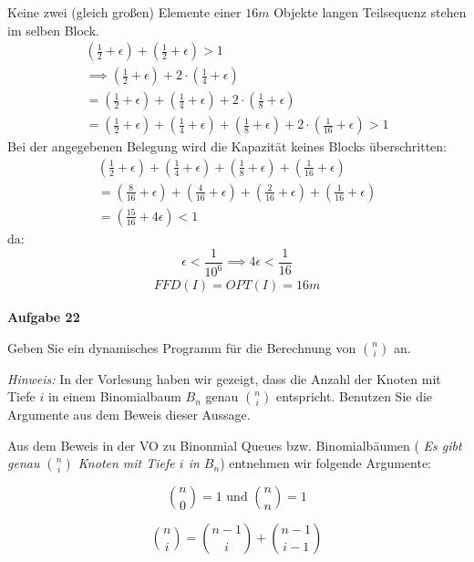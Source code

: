 \documentclass{article}
\begin{document}
Keine zwei (gleich großen) Elemente einer $16m$ Objekte langen Teilsequenz stehen im selben Block.
\begin{align*}
(\frac{1}{2}+\epsilon)+(\frac{1}{2}+\epsilon) > 1\\
\implies (\frac{1}{2}+\epsilon)+2\cdot(\frac{1}{4}+\epsilon)\\ 
=(\frac{1}{2}+\epsilon)+(\frac{1}{4}+\epsilon)+2\cdot(\frac{1}{8}+\epsilon)\\
=(\frac{1}{2}+\epsilon)+(\frac{1}{4}+\epsilon)+(\frac{1}{8}+\epsilon)+2\cdot(\frac{1}{16}+\epsilon) > 1
\end{align*}
\newpage
Bei der angegebenen Belegung wird die Kapazität keines Blocks überschritten:\\
\begin{align*}
(\frac{1}{2}+\epsilon)+(\frac{1}{4}+\epsilon)+(\frac{1}{8}+\epsilon)+(\frac{1}{16}+\epsilon)\\
=(\frac{8}{16}+\epsilon)+(\frac{4}{16}+\epsilon)+(\frac{2}{16}+\epsilon)+(\frac{1}{16}+\epsilon)\\
=(\frac{15}{16}+4\epsilon)<1 
\end{align*}
da:\\
\begin{equation}
	\epsilon<\frac{1}{10^{6}} \implies 4\epsilon<\frac{1}{16}
\end{equation}
\begin{align*}
FFD(I)=OPT(I)=16m
\end{align*}

\clearpage%

{\bfseries Aufgabe 22}%

Geben Sie ein dynamisches Programm f{\"u}r die Berechnung von $\binom{n}{i}$ an.

\emph{Hinweis:} In der Vorlesung haben wir gezeigt, dass die Anzahl der Knoten
mit Tiefe $i$ in einem Binomialbaum $B_n$ genau $\binom{n}{i}$ entspricht.
Benutzen Sie die Argumente aus dem Beweis dieser Aussage.

Aus dem Beweis in der VO zu Binonmial Queues bzw. Binomialb{\"a}umen (
\emph{Es gibt genau $\binom{n}{i}$ Knoten mit Tiefe $i$ in $B_n$}) entnehmen wir
folgende Argumente:

\begin{equation}
\binom{n}{0} = 1 \text{ und } \binom{n}{n} = 1
\end{equation}

\begin{equation}
\binom{n}{i} = \binom{n - 1}{i} + \binom{n - 1}{i - 1}
\end{equation}
\end{document}
